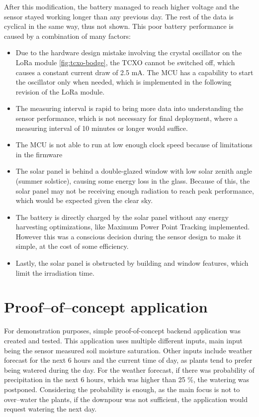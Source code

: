 After this modification, the battery managed to reach higher voltage and the sensor stayed working longer than any previous day. The rest of the data is cyclical in the same way, thus not shown. This poor battery performance is caused by a combination of many factors:
\begin{itemize}
    \item Due to the hardware design mistake involving the crystal oscillator on the LoRa module \ref{fig:tcxo-bodge}, the TCXO cannot be switched off, which causes a constant current draw of 2.5 mA. The MCU has a capability to start the oscillator only when needed, which is implemented in the following revision of the LoRa module.
    \item The measuring interval is rapid to bring more data into understanding the sensor performance, which is not necessary for final deployment, where a measuring interval of 10 minutes or longer would suffice.
    \item The MCU is not able to run at low enough clock speed because of limitations in the firmware
    \item The solar panel is behind a double-glazed window with low solar zenith angle (summer solstice), causing some energy loss in the glass. Because of this, the solar panel may not be receiving enough radiation to reach peak performance, which would be expected given the clear sky.
    \item The battery is directly charged by the solar panel without any energy harvesting optimizations, like Maximum Power Point Tracking implemented. However this was a conscious decision during the sensor design to make it simple, at the cost of some efficiency.
    \item Lastly, the solar panel is obstructed by building and window features, which limit the irradiation time.
\end{itemize}

\section{Proof--of--concept application}
For demonstration purposes, simple proof-of-concept backend application was created and tested. This application uses multiple different inputs, main input being the sensor measured soil moisture saturation. Other inputs include weather forecast for the next 6 hours and the current time of day, as plants tend to prefer being watered during the day. For the weather forecast, if there was probability of precipitation in the next 6 hours, which was higher than 25 \%, the watering was postponed.
Considering the probability is enough, as the main focus is not to over--water the plants, if the downpour was not sufficient, the application would request watering the next day.

